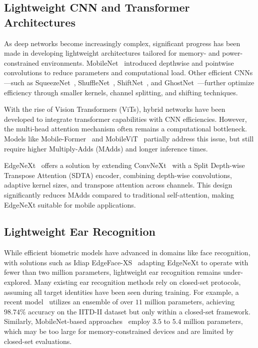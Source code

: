 \subsection{Lightweight CNN and Transformer Architectures}
As deep networks become increasingly complex, significant progress has been made in developing lightweight architectures tailored for memory- and power-constrained environments. MobileNet~\cite{Howard_mobilenet, Sandler_mobilenetv2} introduced depthwise and pointwise convolutions to reduce parameters and computational load. Other efficient CNNs—such as SqueezeNet~\cite{Iandola2_squeezenet}, ShuffleNet~\cite{Zhang_shufflenet}, ShiftNet~\cite{Wu_shift}, and GhostNet~\cite{Han_ghostnet}—further optimize efficiency through smaller kernels, channel splitting, and shifting techniques.

With the rise of Vision Transformers (ViTs), hybrid networks have been developed to integrate transformer capabilities with CNN efficiencies. However, the multi-head attention mechanism often remains a computational bottleneck. Models like Mobile-Former~\cite{Chen_mobileformer} and MobileViT~\cite{Mehta_mobilevit} partially address this issue, but still require higher Multiply-Adds (MAdds) and longer inference times.

EdgeNeXt~\cite{Maaz_edgenext} offers a solution by extending ConvNeXt~\cite{liu_convnext} with a Split Depth-wise Transpose Attention (SDTA) encoder, combining depth-wise convolutions, adaptive kernel sizes, and transpose attention across channels. This design significantly reduces MAdds compared to traditional self-attention, making EdgeNeXt suitable for mobile applications.


\subsection{Lightweight Ear Recognition}

While efficient biometric models have advanced in domains like face recognition, with solutions such as Idiap EdgeFace-XS~\cite{George_IEEETBIOM_2024} adapting EdgeNeXt to operate with fewer than two million parameters, lightweight ear recognition remains under-explored. Many existing ear recognition methods rely on closed-set protocols, assuming all target identities have been seen during training. For example, a recent model~\cite{mehta2024efficient} utilizes an ensemble of over $11$ million parameters, achieving $98.74\%$ accuracy on the IITD-II dataset but only within a closed-set framework. Similarly, MobileNet-based approaches~\cite{xu2022efficient} employ $3.5$ to $5.4$ million parameters, which may be too large for memory-constrained devices and are limited by closed-set evaluations.

